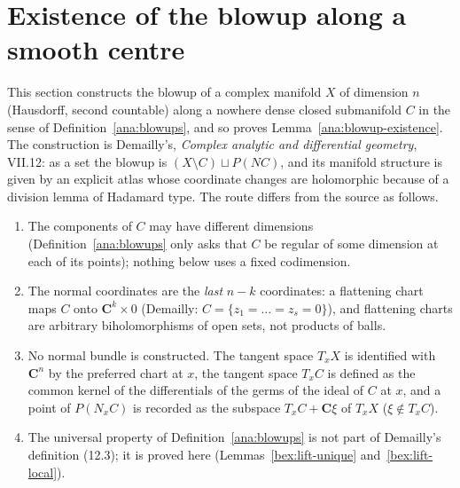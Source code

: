 \section{Existence of the blowup along a smooth centre}
\label{sec:blowup-existence}

This section constructs the blowup of a complex manifold \(X\) of dimension \(n\) (Hausdorff, second countable) along a nowhere dense
closed submanifold \(C\) in the sense of Definition~\ref{ana:blowups}, and so proves Lemma~\ref{ana:blowup-existence}. The construction
is Demailly's, \emph{Complex analytic and differential geometry}, VII.12: as a set the blowup is \((X\setminus C)\sqcup P(NC)\), and its
manifold structure is given by an explicit atlas whose coordinate changes are holomorphic because of a division lemma of Hadamard type.
The route differs from the source as follows.
\begin{enumerate}
\item The components of \(C\) may have different dimensions (Definition~\ref{ana:blowups} only asks that \(C\) be regular of some dimension at
each of its points); nothing below uses a fixed codimension.
\item The normal coordinates are the \emph{last} \(n-k\) coordinates: a flattening chart maps \(C\) onto \(\mathbf C^k\times0\) (Demailly:
\(C=\{z_1=\dots=z_s=0\}\)), and flattening charts are arbitrary biholomorphisms of open sets, not products of balls.
\item No normal bundle is constructed. The tangent space \(T_xX\) is identified with \(\mathbf C^n\) by the preferred chart at \(x\), the tangent
space \(T_xC\) is defined as the common kernel of the differentials of the germs of the ideal of \(C\) at \(x\), and a point of \(P(N_xC)\) is
recorded as the subspace \(T_xC+\mathbf C\xi\) of \(T_xX\) (\(\xi\notin T_xC\)).
\item The universal property of Definition~\ref{ana:blowups} is not part of Demailly's definition (12.3); it is proved here
(Lemmas~\ref{bex:lift-unique} and~\ref{bex:lift-local}).
\end{enumerate}

